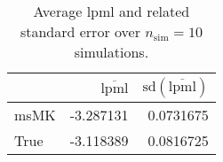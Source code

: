 \begin{table}[H]

\caption{Average lpml and related standard error over $n_{\text{sim}} = 10$ simulations.}
\centering
\begin{tabular}[t]{lrr}
\toprule
  & $\overbar{\text{lpml}}$ & $\text{sd}(\overbar{\text{lpml}})$\\
\midrule
msMK & -3.287131 & 0.0731675\\
True & -3.118389 & 0.0816725\\
\bottomrule
\end{tabular}
\end{table}
